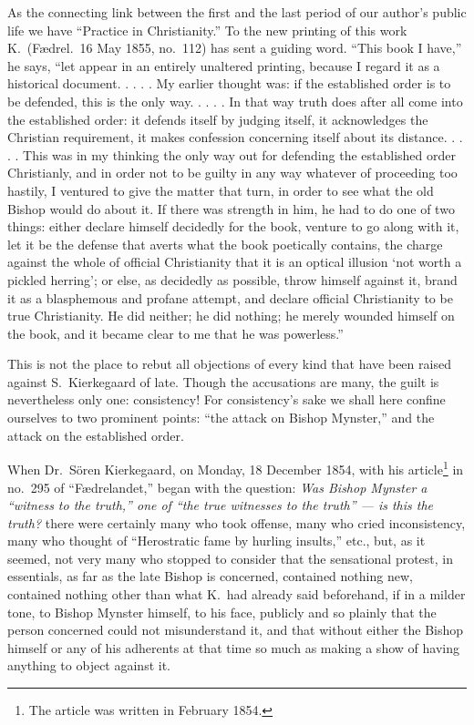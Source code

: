 \documentclass[12pt,a4paper]{article}
\newcommand{\opage}[1]{\marginnote{\footnotesize\textit{[#1]}}}
\begin{document}
As the connecting link between the first and the last period of our
author's public life we have ``Practice in Christianity.'' To the new
printing of this work K.\ (Fædrel.\ 16 May 1855, no.~112) has sent a
guiding word. ``This book I have,'' he says, ``let appear in an
entirely unaltered printing, because I regard it as a historical
document. . . . . My earlier thought was: if the established order is
to be defended, this is the only way. . . . . In that way
\opage{17}truth does after all come into the established order: it defends
itself by judging itself, it acknowledges the Christian requirement, it
makes confession concerning itself about its distance. . . . . This was
in my thinking the only way out for defending the established order
Christianly, and in order not to be guilty in any way whatever of
proceeding too hastily, I ventured to give the matter that turn, in
order to see what the old Bishop would do about it. If there was
strength in him, he had to do one of two things: either declare himself
decidedly for the book, venture to go along with it, let it be the
defense that averts what the book poetically contains, the charge
against the whole of official Christianity that it is an optical
illusion `not worth a pickled herring'; or else, as decidedly as
possible, throw himself against it, brand it as a blasphemous and
profane attempt, and declare official Christianity to be true
Christianity. He did neither; he did nothing; he merely wounded himself
on the book, and it became clear to me that he was powerless.''

This is not the place to rebut all objections of every kind that have
been raised against S.\ Kierkegaard of late. Though the
accusations are many, the guilt is nevertheless only one: consistency!
For consistency's sake we shall here confine ourselves to two prominent
points: ``the attack on Bishop Mynster,'' and the attack on the
established order.

When Dr.\ Sören Kierkegaard, on Monday, 18 December 1854, with his
article\footnote{The article was written in February 1854.} in no.~295
of ``Fædrelandet,'' began with the question: \emph{Was Bishop Mynster a
``witness to the truth,'' one of ``the true witnesses to the
truth'' --- is this the truth?} there were certainly many who took
offense, many who cried inconsistency, many who thought of ``Herostratic
fame by hurling insults,'' etc., but, as it
\opage{18}seemed, not very many who stopped to consider that the sensational
protest, in essentials, as far as the late Bishop is concerned,
contained nothing new, contained nothing other than what K.\ had already
said beforehand, if in a milder tone, to Bishop Mynster himself, to his
face, publicly and so plainly that the person concerned could not
misunderstand it, and that without either the Bishop himself or any of
his adherents at that time so much as making a show of having anything
to object against it.
\end{document}

